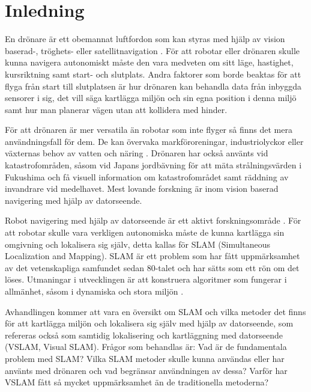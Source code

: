\chapter{Inledning}

En drönare är ett obemannat luftfordon som kan styras med hjälp av vision baserad-, tröghets- eller satellitnavigation \citep{geospatial}. För att robotar eller drönaren skulle kunna navigera autonomiskt måste den vara medveten om sitt läge, hastighet, kursriktning samt start- och slutplats. Andra faktorer som borde beaktas för att flyga från start till slutplatsen är hur drönaren kan behandla data från inbyggda sensorer i sig, det vill säga kartlägga miljön och sin egna position i denna miljö samt hur man planerar vägen utan att kollidera med hinder.

För att drönaren är mer versatila än robotar som inte flyger så finns det mera användningsfall för dem. De kan övervaka markföroreningar, industriolyckor eller växternas behov av vatten och näring \citep{crowdsurveillance}. Drönaren har också använts vid katastrofområden, såsom vid Japans jordbävning för att mäta strålningsvärden i Fukushima och få visuell information om katastrofområdet samt räddning av invandrare vid medelhavet. Mest lovande forskning är inom vision baserad navigering med hjälp av datorseende.

Robot navigering med hjälp av datorseende är ett aktivt forskningsområde \citep{982903}. För att robotar skulle vara verkligen autonomiska måste de kunna kartlägga sin omgivning och lokalisera sig själv, detta kallas för SLAM (Simultaneous Localization and Mapping). SLAM är ett problem som har fått uppmärksamhet av det vetenskapliga samfundet sedan 80-talet och har sätts som ett rön om det löses. Utmaningar i utvecklingen är att konstruera algoritmer som fungerar i allmänhet, såsom i dynamiska och stora miljön \citep{realslamproblem}.

Avhandlingen kommer att vara en översikt om SLAM och vilka metoder det finns för att kartlägga miljön och lokalisera sig själv med hjälp av datorseende, som refereras också som samtidig lokalisering och kartläggning med datorseende (VSLAM, Visual SLAM). Frågor som behandlas är: Vad är de fundamentala problem med SLAM? Vilka SLAM metoder skulle kunna användas eller har använts med drönaren och vad begränsar användningen av dessa? Varför har VSLAM fått så mycket uppmärksamhet än de traditionella metoderna?

\iffalse
Några frågor som provas att svara på är varför används vision baserad navigation istället för andra metoder? Vad är för och nackdelar med vision baserad navigation när det kommer till drönaren?
\fi

